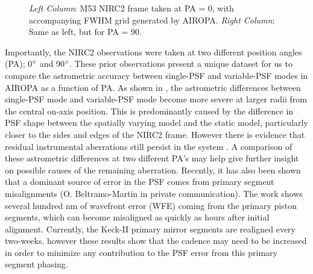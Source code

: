 \documentclass[]{spie}  %
\begin{document}
\begin{figure}[!htb]
 \caption{\footnotesize \textit{Left Column}: M53 NIRC2 frame taken at PA = 0, with accompanying FWHM grid generated by AIROPA. \textit{Right Column}: Same as left, but for PA = 90.} \label{fig:m53_image_grid}
\end{figure}

Importantly, the NIRC2 observations were taken at two different position angles (PA); 0$\degree$ and 90$\degree$. These prior observations present a unique dataset for us to compare the astrometric accuracy between single-PSF and variable-PSF modes in AIROPA as a function of PA. As shown in \cite{Turri:inprep}, the astrometric differences between single-PSF mode and variable-PSF mode become more severe at larger radii from the central on-axis position. This is predominantly caused by the difference in PSF shape between the spatially varying model and the static model, particularly closer to the sides and edges of the NIRC2 frame. However there is evidence that residual instrumental aberrations still persist in the system \citep{Turri:inprep}. A comparison of these astrometric differences at two different PA's may help give further insight on possible causes of the remaining aberration. Recently, it has also been shown that a dominant source of error in the PSF comes from primary segment misalignments (O. Beltramo-Martin in private communication). The work shows several hundred nm of wavefront error (WFE) coming from the primary piston segments, which can become misaligned as quickly as hours after initial alignment. Currently, the Keck-II primary mirror segments are realigned every two-weeks, however these results show that the cadence may need to be increased in order to minimize any contribution to the PSF error from this primary segment phasing.
\end{document}
